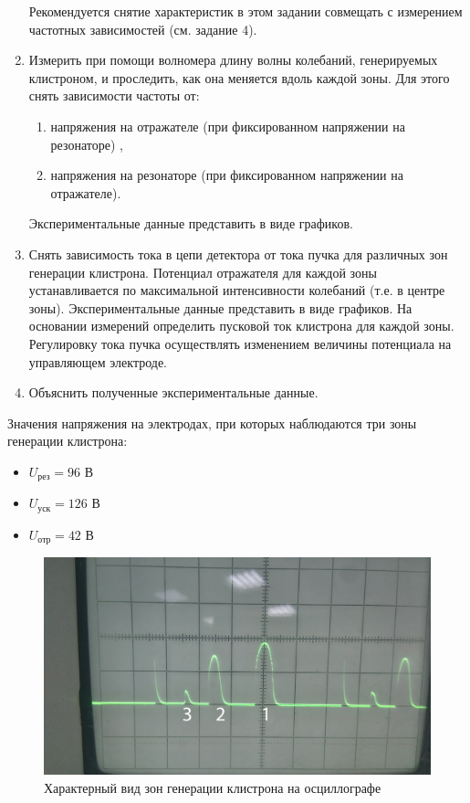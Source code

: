 \begin{enumerate}
	Рекомендуется снятие характеристик в этом задании совмещать с измерением частотных зависимостей (см. задание 4).

	\item Измерить при помощи волномера длину волны колебаний, генерируемых клистроном, и проследить, как она меняется вдоль каждой зоны. Для
	этого снять зависимости частоты от:
		\begin{enumerate}
			\item  напряжения на отражателе (при фиксированном напряжении на резонаторе) ,
			\item  напряжения на резонаторе (при фиксированном напряжении на отражателе).
		\end{enumerate}
	
	Экспериментальные данные представить в виде графиков.

	\item  Снять зависимость тока в цепи детектора от тока пучка для различных зон генерации клистрона. Потенциал отражателя для каждой зоны устанавливается по максимальной интенсивности колебаний (т.е. в центре зоны). Экспериментальные данные представить в виде графиков. На основании измерений определить пусковой ток клистрона для каждой зоны. Регулировку	тока пучка осуществлять изменением величины потенциала на управляющем электроде.

	\item  Объяснить полученные экспериментальные данные.

\end{enumerate}
\newpage
Значения напряжения на электродах, при которых наблюдаются три зоны генерации клистрона:
\begin{itemize}
	\item $U_{\text{рез}}=96$ В
	\item $U_{\text{уск}}=126$ В
	\item $U_{\text{отр}}=42$ В
\end{itemize}
\begin{figure}[h!]
	\centering
	\includegraphics[width=\linewidth]{img/img1}
	\caption{Характерный вид зон генерации клистрона на осциллографе}
	\label{fig:img1}
\end{figure}
